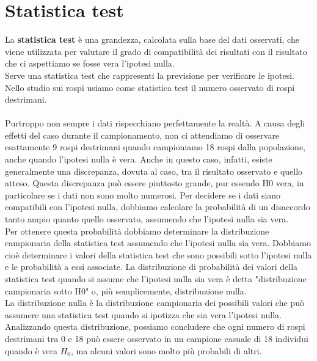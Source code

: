 \documentclass[drafts, 10pt]{book}
\begin{document}
\section{Statistica test}
La \textbf{statistica test} è una grandezza, calcolata sulla base del dati osservati, che viene utilizzata per valutare il grado di compatibilità dei risultati con il risultato che ci aspettiamo se fosse vera l'ipotesi nulla.
\\
Serve una statistica test che rappresenti la previsione per verificare le ipotesi.
\\
Nello studio sui rospi usiamo come statistica test il numero osservato di rospi destrimani. 
\\
\\
Purtroppo non sempre i dati rispecchiano perfettamente la realtà. A causa degli effetti del caso durante il campionamento, non ci attendiamo di osservare esattamente 9 rospi destrimani quando campioniamo 18 rospi dalla popolazione, anche quando l'ipotesi nulla è vera. Anche in questo caso, infatti, esiste generalmente una discrepanza, dovuta al caso, tra il risultato osservato e quello atteso. Questa discrepanza può essere piuttosto grande, pur essendo H0 vera, in particolare se i dati non sono molto numerosi. Per decidere se i dati siano compatibili con l'ipotesi nulla, dobbiamo calcolare la probabilità di un disaccordo tanto ampio quanto quello osservato, assumendo che l'ipotesi nulla sia vera.
\\
Per ottenere questa probabilità dobbiamo determinare la distribuzione campionaria della statistica test assumendo che l'ipotesi nulla sia vera. Dobbiamo cioè determinare i valori della statistica test che sono possibili sotto l'ipotesi nulla e le probabilità a essi associate. La distribuzione di probabilità dei valori della statistica test quando si assume che l'ipotesi nulla sia vera è detta "distribuzione campionaria sotto H0" o, più semplicemente, distribuzione nulla. 
\\
La distribuzione nulla è la distribuzione campionaria dei possibili valori che può assumere una statistica test quando si ipotizza che sia vera l'ipotesi nulla.
\\
Analizzando questa distribuzione, possiamo concludere che ogni numero di rospi destrimani tra 0 e 18 può essere osservato in un campione casuale di 18 individui quando è vera $H_0$, ma alcuni valori sono molto più probabili di altri.
\end{document}
